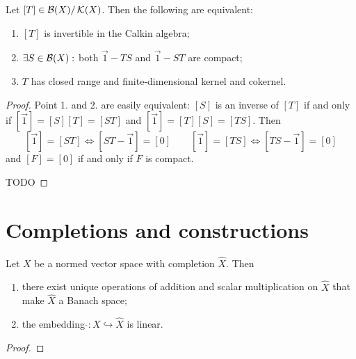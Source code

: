 \begin{proposition}
Let $[T]\in\operatorname{\mathcal{B}}(X)/\operatorname{\mathcal{K}}(X)$. Then the following are equivalent:
\begin{enumerate}
\item $[T]$ is invertible in the Calkin algebra;
\item $\exists S\in\operatorname{\mathcal{B}}(X):$ both $\vec{1}-TS$ and $\vec{1}-ST$ are compact;
\item $T$ has closed range and finite-dimensional kernel and cokernel. 
\end{enumerate}
\end{proposition}
\begin{proof}
Point 1. and 2. are easily equivalent: $[S]$ is an inverse of $[T]$ if and only if $[\vec{1}] = [S][T] = [ST]$ and $[\vec{1}] = [T][S] = [TS]$. Then
\[ [\vec{1}] = [ST] \iff [ST - \vec{1}] = [0] \qquad [\vec{1}] = [TS] \iff [TS - \vec{1}] = [0] \]
and $[F]=[0]$ if and only if $F$ is compact.

TODO
\end{proof}


\section{Completions and constructions}

\begin{lemma} \label{embeddingInCompletionLinear}
Let $X$ be a normed vector space with completion $\hat{X}$. Then
\begin{enumerate}
\item there exist unique operations of addition and scalar multiplication on $\hat{X}$ that make $\hat{X}$ a Banach space;
\item the embedding $\hat{}: X \hookrightarrow \hat{X}$ is linear.
\end{enumerate}
\end{lemma}
\begin{proof}

\end{proof}


